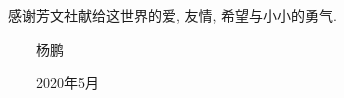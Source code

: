 ﻿
\begin{thanks}

感谢芳文社献给这世界的爱,\,\,友情,\,\,希望与小小的勇气.







\vskip 18pt

\begin{flushright}

~~~~杨鹏~~~~


~~~~2020年5月~~~~

\end{flushright}

\end{thanks}
